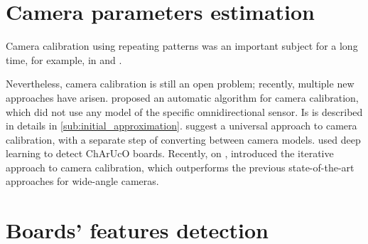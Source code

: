 \section{Camera parameters estimation}\label{sub:camera_parameters_estimation}

Camera calibration using repeating patterns was an important subject for a long
time, for example, \cite{schaffalitzkyGeometricGroupingRepeated1998} in
\citeyear{schaffalitzkyGeometricGroupingRepeated1998} and
\cite{zhangFlexibleNewTechnique2000}.


Nevertheless, camera calibration is still an open problem; recently,
multiple new approaches have arisen.
\cite{scaramuzzaToolboxEasilyCalibrating2006} proposed an automatic algorithm
for camera calibration, which did not use any model of the specific omnidirectional
sensor. Is is described in details in \cref{sub:initial_approximation}.
\cite{lochmanBabelCalibUniversalApproach2021} suggest a universal approach
to camera calibration, with a separate step of converting between camera models.
\cite{huDeepChArUcoDark2019} used deep learning to detect ChArUcO boards.
Recently, on ,
\cite{duisterhofTartanCalibIterativeWideAngle2022} introduced the iterative
approach to camera calibration, which outperforms the previous state-of-the-art
approaches for wide-angle cameras.


\section{Boards' features detection}\label{sec:boards_features_detection}

